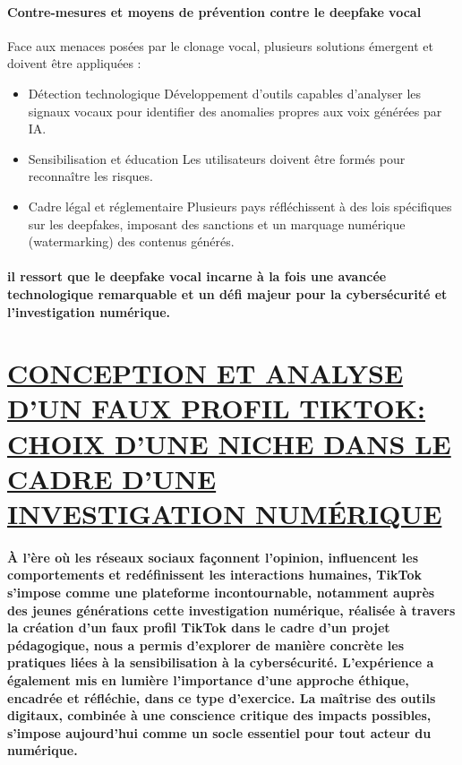 \documentclass{article}
\begin{document}
\paragraph{Contre-mesures et moyens de prévention contre le deepfake vocal}
 Face aux menaces posées par le clonage vocal, plusieurs solutions émergent et doivent être appliquées :

\begin{itemize}
\item Détection technologique Développement d’outils capables d’analyser les signaux vocaux pour identifier des anomalies propres aux voix générées par IA.
\item Sensibilisation et éducation Les utilisateurs doivent être formés pour reconnaître les risques.
\item Cadre légal et réglementaire Plusieurs pays réfléchissent à des lois spécifiques sur les deepfakes, imposant des sanctions et un marquage numérique (watermarking) des contenus générés.
\ 


\end{itemize}

\paragraph{il ressort que le deepfake vocal incarne à la fois une avancée technologique remarquable et un défi majeur pour la cybersécurité et l’investigation numérique.}




\section{\underline{ CONCEPTION ET ANALYSE D’UN FAUX PROFIL TIKTOK:  CHOIX D’UNE NICHE  DANS LE CADRE D’UNE INVESTIGATION NUMÉRIQUE}}

\paragraph{ À l’ère où les réseaux sociaux façonnent l’opinion, influencent les comportements et redéfinissent les interactions humaines, TikTok s’impose comme une plateforme incontournable, notamment auprès des jeunes générations
 cette investigation numérique, réalisée à travers la création d’un faux profil TikTok dans le cadre d’un projet pédagogique, nous a permis d’explorer de manière concrète les pratiques liées à la sensibilisation à la cybersécurité.
 L’expérience a également mis en lumière l’importance d’une approche éthique, encadrée et réfléchie, dans ce type d’exercice. La maîtrise des outils digitaux, combinée à une conscience critique des impacts possibles, s’impose aujourd’hui comme un socle essentiel pour tout acteur du numérique.}
\end{document}
